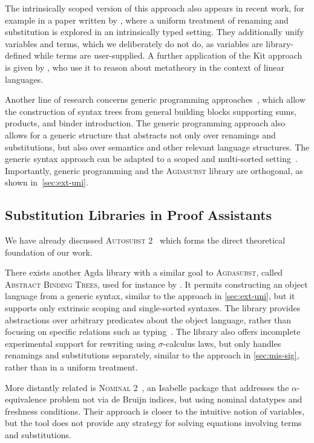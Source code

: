 \documentclass[screen,nonacm]{acmart}
\begin{document}
The intrinsically scoped version of this approach also appears in recent work,
for example in a paper written by \citet{altenkirch2025substitution}, where a
uniform treatment of renaming and substitution is explored in an intrinsically
typed setting. They additionally unify variables and terms, which we
deliberately do not do, as variables are library-defined while terms are
user-supplied. A further application of the Kit approach is given by
\citet{Wood_2021}, who use it to reason about metatheory in the context of
linear languages.

Another line of research concerns generic programming
approaches~\cite{allais2021typescopesafeuniverse, 10.1145/3018610.3018613},
which allow the construction of syntax trees from general building blocks
supporting sums, products, and binder introduction. The generic programming
approach also allows for a generic structure that abstracts not only over
renamings and substitutions, but also over semantics and other relevant
language structures. The generic syntax approach can be adapted to a scoped and
multi-sorted setting~\cite{saffrich:LIPIcs.ITP.2024.32}. Importantly, generic
programming and the \textsc{Agdasubst} library are orthogonal, as shown
in~\cref{sec:ext-uni}.

\subsection*{Substitution Libraries in Proof Assistants}
We have already discussed \textsc{Autosubst 2}~\cite{10.1145/3293880.3294101,
      schafer2015autosubst, Stark:2020:Mechanising} which forms the direct
theoretical foundation of our work.

There exists another Agda library with a similar goal to \textsc{Agdasubst},
called \textsc{Abstract Binding Trees}, used for instance by
\citet{siek2021parameterized}. It permits constructing an object language from
a generic syntax, similar to the approach in \cref{sec:ext-uni}, but it
supports only extrinsic scoping and single-sorted syntaxes. The library
provides abstractions over arbitrary predicates about the object language,
rather than focusing on specific relations such as
typing~\cite{saffrich:LIPIcs.ITP.2024.32}. The library also offers incomplete
experimental support for rewriting using $\sigma$-calculus laws, but only
handles renamings and substitutions separately, similar to the approach in
\cref{sec:mis-sig}, rather than in a uniform treatment.

More distantly related is \textsc{Nominal 2}~\cite{Nominal2-AFP}, an Isabelle
package that addresses the $α$-equivalence problem not via de Bruijn indices,
but using nominal datatypes and freshness conditions. Their approach is closer
to the intuitive notion of variables, but the tool does not provide any
strategy for solving equations involving terms and substitutions.
\end{document}
